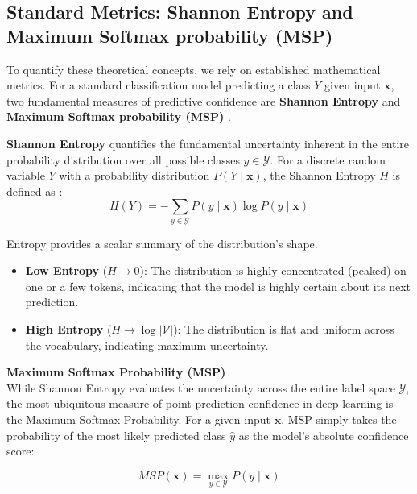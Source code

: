\subsection{Standard Metrics: Shannon Entropy and Maximum Softmax probability (MSP)}
\label{sec:background:uncertainty:standard_metrics}
To quantify these theoretical concepts, we rely on established
mathematical metrics. For a standard classification model 
predicting a class $Y$ given input $\mathbf{x}$, two fundamental 
measures of predictive confidence are \textbf{Shannon Entropy}
\parencite{https://doi.org/10.1002/j.1538-7305.1948.tb01338.x} and 
\textbf{Maximum Softmax probability (MSP)} 
\parencite{hendrycks2018baselinedetectingmisclassifiedoutofdistribution}.

\textbf{Shannon Entropy} 
quantifies the fundamental uncertainty inherent in the entire
probability distribution over all possible classes 
$y \in \mathcal{Y}$.
For a discrete random variable $Y$ with a probability 
distribution
$P(Y \mid \mathbf{x})$, the Shannon Entropy $H$ is defined as
\parencite{https://doi.org/10.1002/j.1538-7305.1948.tb01338.x}:
\begin{equation}
    H(Y) = - \sum_{y \in \mathcal{Y}} P(y \mid \mathbf{x}) \log P(y \mid \mathbf{x})
    \label{eq:shannon_entropy}
\end{equation}

Entropy provides a scalar summary of the distribution's shape.
\begin{itemize}
    \item \textbf{Low Entropy} ($H \rightarrow 0$): The distribution
	is highly concentrated (peaked) on one or a few tokens, 
	indicating that the model is highly certain about its 
	next prediction.

    \item \textbf{High Entropy} ($H \rightarrow \log |\mathcal{V}|$):
	The distribution is flat and uniform across the vocabulary,
	indicating maximum uncertainty.
\end{itemize}


\textbf{Maximum Softmax Probability (MSP)} \\
While Shannon Entropy evaluates the uncertainty across the entire
label space $\mathcal{Y}$, the most ubiquitous measure of
point-prediction confidence in deep learning is the Maximum Softmax
Probability. For a given input $\mathbf{x}$, MSP simply takes the
probability of the most likely predicted class $\hat{y}$ as the 
model's absolute confidence score:

\begin{equation}
    MSP(\mathbf{x}) = \max_{y \in \mathcal{Y}} P(y \mid \mathbf{x})
    \label{eq:msp}
\end{equation}

